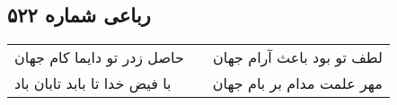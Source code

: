 \begin{center}
\section*{رباعی شماره ۵۲۲}
\label{sec:sh522}
\begin{longtable}{l p{0.5cm} r}
حاصل زدر تو دایما کام جهان
&&
لطف تو بود باعث آرام جهان
\\
با فیض خدا تا بابد تابان باد
&&
مهر علمت مدام بر بام جهان
\\
\end{longtable}
\end{center}
